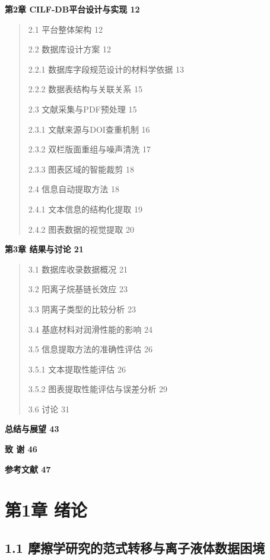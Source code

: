 \textbf{第2章 CILF-DB平台设计与实现 12}

\begin{quote}
2.1 平台整体架构 12

2.2 数据库设计方案 12

2.2.1 数据库字段规范设计的材料学依据 13

2.2.2 数据表结构与关联关系 15

2.3 文献采集与PDF预处理 15

2.3.1 文献来源与DOI查重机制 16

2.3.2 双栏版面重组与噪声清洗 17

2.3.3 图表区域的智能裁剪 18

2.4 信息自动提取方法 18

2.4.1 文本信息的结构化提取 19

2.4.2 图表数据的视觉提取 20
\end{quote}

\textbf{第3章 结果与讨论 21}

\begin{quote}
3.1 数据库收录数据概况 21

3.2 阳离子烷基链长效应 23

3.3 阴离子类型的比较分析 23

3.4 基底材料对润滑性能的影响 24

3.5 信息提取方法的准确性评估 26

3.5.1 文本提取性能评估 26

3.5.2 图表提取性能评估与误差分析 29

3.6 讨论 31
\end{quote}

\textbf{总结与展望 43}

\textbf{致 谢 46}

\textbf{参考文献 47}

\hypertarget{ux7b2c1ux7ae0-ux7eeaux8bba}{%
\section{第1章 绪论}\label{ux7b2c1ux7ae0-ux7eeaux8bba}}

\hypertarget{ux6469ux64e6ux5b66ux7814ux7a76ux7684ux8303ux5f0fux8f6cux79fbux4e0eux79bbux5b50ux6db2ux4f53ux6570ux636eux56f0ux5883}{%
\subsection{1.1 摩擦学研究的范式转移与离子液体数据困境}\label{ux6469ux64e6ux5b66ux7814ux7a76ux7684ux8303ux5f0fux8f6cux79fbux4e0eux79bbux5b50ux6db2ux4f53ux6570ux636eux56f0ux5883}}

